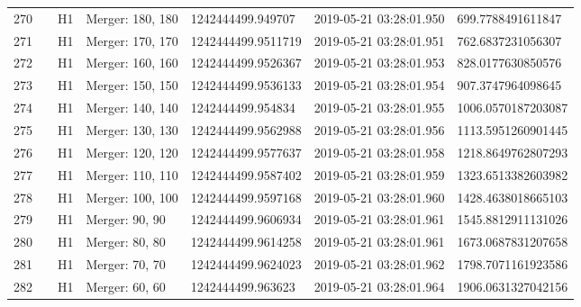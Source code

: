 \begin{longtable}{lllllll}
270  &                                                    &       H1 &  Merger: 180, 180 &   1242444499.949707 &  2019-05-21 03:28:01.950 &   699.7788491611847 \\
271  &                                                    &       H1 &  Merger: 170, 170 &  1242444499.9511719 &  2019-05-21 03:28:01.951 &   762.6837231056307 \\
272  &                                                    &       H1 &  Merger: 160, 160 &  1242444499.9526367 &  2019-05-21 03:28:01.953 &   828.0177630850576 \\
273  &                                                    &       H1 &  Merger: 150, 150 &  1242444499.9536133 &  2019-05-21 03:28:01.954 &   907.3747964098645 \\
274  &                                                    &       H1 &  Merger: 140, 140 &   1242444499.954834 &  2019-05-21 03:28:01.955 &  1006.0570187203087 \\
275  &                                                    &       H1 &  Merger: 130, 130 &  1242444499.9562988 &  2019-05-21 03:28:01.956 &  1113.5951260901445 \\
276  &                                                    &       H1 &  Merger: 120, 120 &  1242444499.9577637 &  2019-05-21 03:28:01.958 &  1218.8649762807293 \\
277  &                                                    &       H1 &  Merger: 110, 110 &  1242444499.9587402 &  2019-05-21 03:28:01.959 &  1323.6513382603982 \\
278  &                                                    &       H1 &  Merger: 100, 100 &  1242444499.9597168 &  2019-05-21 03:28:01.960 &  1428.4638018665103 \\
279  &                                                    &       H1 &    Merger: 90, 90 &  1242444499.9606934 &  2019-05-21 03:28:01.961 &  1545.8812911131026 \\
280  &                                                    &       H1 &    Merger: 80, 80 &  1242444499.9614258 &  2019-05-21 03:28:01.961 &  1673.0687831207658 \\
281  &                                                    &       H1 &    Merger: 70, 70 &  1242444499.9624023 &  2019-05-21 03:28:01.962 &  1798.7071161923586 \\
282  &                                                    &       H1 &    Merger: 60, 60 &   1242444499.963623 &  2019-05-21 03:28:01.964 &  1906.0631327042156 \\

\end{longtable}
